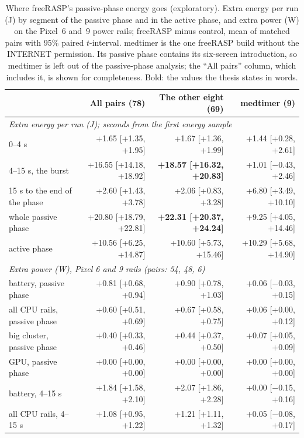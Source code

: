 \begin{table}[t]
\centering
\small
\caption{Where freeRASP's passive-phase energy goes (exploratory). Extra energy per run (J) by segment of the passive phase and in the active phase, and extra power (W) on the Pixel~6 and~9 power rails; freeRASP minus control, mean of matched pairs with 95\% paired $t$-interval. medtimer is the one freeRASP build without the INTERNET permission. Its passive phase contains its six-screen introduction, so medtimer is left out of the passive-phase analysis; the ``All pairs'' column, which includes it, is shown for completeness. Bold: the values the thesis states in words.}
\label{tab:freerasp-postlaunch}
\begin{tabular}{lrrr}
\toprule
\textbf{} & \textbf{All pairs (78)} & \textbf{The other eight (69)} & \textbf{medtimer (9)} \\
\midrule
\multicolumn{4}{l}{\textit{Extra energy per run (J); seconds from the first energy sample}} \\
0--4 s & +1.65 [+1.35, +1.95] & +1.67 [+1.36, +1.99] & +1.44 [+0.28, +2.61] \\
4--15 s, the burst & +16.55 [+14.18, +18.92] & \textbf{+18.57 [+16.32, +20.83]} & +1.01 [$-$0.43, +2.46] \\
15 s to the end of the phase & +2.60 [+1.43, +3.78] & +2.06 [+0.83, +3.28] & +6.80 [+3.49, +10.10] \\
whole passive phase & +20.80 [+18.79, +22.81] & \textbf{+22.31 [+20.37, +24.24]} & +9.25 [+4.05, +14.46] \\
active phase & +10.56 [+6.25, +14.87] & +10.60 [+5.73, +15.46] & +10.29 [+5.68, +14.90] \\
\midrule
\multicolumn{4}{l}{\textit{Extra power (W), Pixel 6 and 9 rails (pairs: 54, 48, 6)}} \\
battery, passive phase & +0.81 [+0.68, +0.94] & +0.90 [+0.78, +1.03] & +0.06 [$-$0.03, +0.15] \\
all CPU rails, passive phase & +0.60 [+0.51, +0.69] & +0.67 [+0.58, +0.75] & +0.06 [+0.00, +0.12] \\
big cluster, passive phase & +0.40 [+0.33, +0.46] & +0.44 [+0.37, +0.50] & +0.07 [+0.05, +0.09] \\
GPU, passive phase & +0.00 [+0.00, +0.00] & +0.00 [+0.00, +0.00] & +0.00 [+0.00, +0.00] \\
battery, 4--15 s & +1.84 [+1.58, +2.10] & +2.07 [+1.86, +2.28] & +0.00 [$-$0.15, +0.16] \\
all CPU rails, 4--15 s & +1.08 [+0.95, +1.22] & +1.21 [+1.11, +1.32] & +0.05 [$-$0.08, +0.17] \\

\end{tabular}
\end{table}
